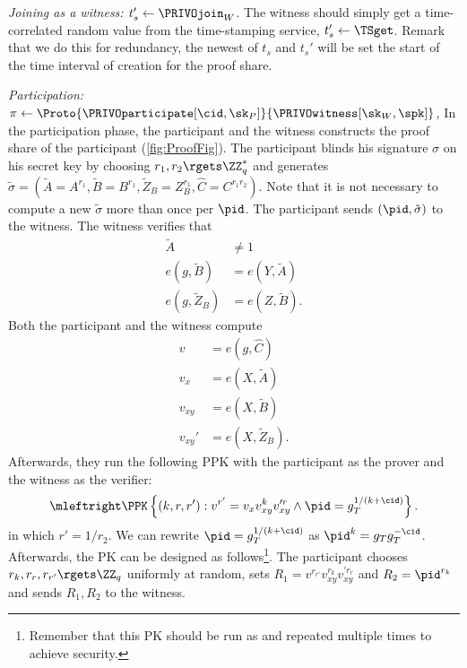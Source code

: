 \emph{Joining as a witness: \(t_s'\gets \PRIVOjoin_W\).}
The witness should simply get a time-correlated random value from the time-stamping service, \(t_s'\gets \TSget\).
Remark that we do this for redundancy, the newest of \(t_s\) and \(t_s'\) will be set the start of the time interval of creation for the proof share.


\emph{Participation: \(\pi\gets
    \Proto{\PRIVOparticipate[\cid, \sk_P]}{\PRIVOwitness[\sk_W, \spk]}\),}
In the participation phase, the participant and the witness constructs the proof share of the participant (\cref{fig:ProofFig}).
The participant blinds his signature \(\sigma\) on his secret key by choosing \(r_1, r_2\rgets \ZZ_q^*\) and generates \(
  \tilde\sigma = (\tilde A = A^{r_1},
                  \tilde B = B^{r_1},
                  \tilde Z_B = Z_B^{r_1},
                  \hat C = C^{r_1 r_2}).
\) 
Note that it is not necessary to compute a new \(\tilde\sigma\) more than once per \(\pid\).
The participant sends \((\pid, \tilde\sigma)\) to the witness.
The witness verifies that
\begin{align*}
  \tilde A          &\neq 1 \\
  e(g, \tilde B)    &= e(Y, \tilde A) \\
  e(g, \tilde Z_B)  &= e(Z, \tilde B).
\end{align*}
Both the participant and the witness compute
\begin{align*}
  v &= e(g, \hat C) \\
  v_x &= e(X, \tilde A) \\
  v_{xy} &= e(X, \tilde B) \\
  v_{xy}' &= e(X, \tilde Z_B).
\end{align*}
Afterwards, they run the following \ac{PPK} with the participant as the prover and the witness as the verifier:
\begin{multline*}
  \mleftright
  \PPK\left\{(k, r, r') : v^{r'} = v_x v_{xy}^k v_{xy}^{\prime r} \land
    \pid = g_T^{1/(k+\cid)} \right\}.
\end{multline*}
in which \(r' = 1/r_2\).
We can rewrite \(\pid = g_T^{1/(k+\cid)}\) as \(\pid^k = g_T g_T^{-\cid}\).
Afterwards, the \ac{PK} can be designed as follows\footnote{Remember that this \ac{PK} should be run as  and repeated multiple times to achieve security.}.
The participant chooses \(r_k, r_r, r_{r'}\rgets \ZZ_q\) uniformly at random, sets \(R_1 = v^{r_{r'}} v_{xy}^{r_k} v_{xy}^{\prime r_r}\) and \(R_2 = \pid^{r_k}\) and sends \(R_1, R_2\) to the witness.
